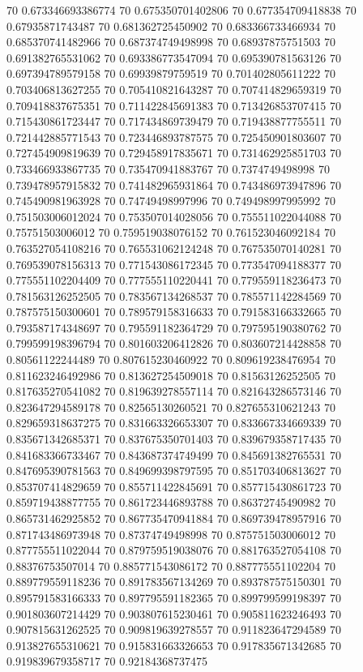{70 0.673346693386774
70 0.675350701402806
70 0.677354709418838
70 0.67935871743487
70 0.681362725450902
70 0.683366733466934
70 0.685370741482966
70 0.687374749498998
70 0.68937875751503
70 0.691382765531062
70 0.693386773547094
70 0.695390781563126
70 0.697394789579158
70 0.69939879759519
70 0.701402805611222
70 0.703406813627255
70 0.705410821643287
70 0.707414829659319
70 0.709418837675351
70 0.711422845691383
70 0.713426853707415
70 0.715430861723447
70 0.717434869739479
70 0.719438877755511
70 0.721442885771543
70 0.723446893787575
70 0.725450901803607
70 0.727454909819639
70 0.729458917835671
70 0.731462925851703
70 0.733466933867735
70 0.735470941883767
70 0.7374749498998
70 0.739478957915832
70 0.741482965931864
70 0.743486973947896
70 0.745490981963928
70 0.74749498997996
70 0.749498997995992
70 0.751503006012024
70 0.753507014028056
70 0.755511022044088
70 0.75751503006012
70 0.759519038076152
70 0.761523046092184
70 0.763527054108216
70 0.765531062124248
70 0.767535070140281
70 0.769539078156313
70 0.771543086172345
70 0.773547094188377
70 0.775551102204409
70 0.777555110220441
70 0.779559118236473
70 0.781563126252505
70 0.783567134268537
70 0.785571142284569
70 0.787575150300601
70 0.789579158316633
70 0.791583166332665
70 0.793587174348697
70 0.795591182364729
70 0.797595190380762
70 0.799599198396794
70 0.801603206412826
70 0.803607214428858
70 0.80561122244489
70 0.807615230460922
70 0.809619238476954
70 0.811623246492986
70 0.813627254509018
70 0.81563126252505
70 0.817635270541082
70 0.819639278557114
70 0.821643286573146
70 0.823647294589178
70 0.82565130260521
70 0.827655310621243
70 0.829659318637275
70 0.831663326653307
70 0.833667334669339
70 0.835671342685371
70 0.837675350701403
70 0.839679358717435
70 0.841683366733467
70 0.843687374749499
70 0.845691382765531
70 0.847695390781563
70 0.849699398797595
70 0.851703406813627
70 0.853707414829659
70 0.855711422845691
70 0.857715430861723
70 0.859719438877755
70 0.861723446893788
70 0.86372745490982
70 0.865731462925852
70 0.867735470941884
70 0.869739478957916
70 0.871743486973948
70 0.87374749498998
70 0.875751503006012
70 0.877755511022044
70 0.879759519038076
70 0.881763527054108
70 0.88376753507014
70 0.885771543086172
70 0.887775551102204
70 0.889779559118236
70 0.891783567134269
70 0.893787575150301
70 0.895791583166333
70 0.897795591182365
70 0.899799599198397
70 0.901803607214429
70 0.903807615230461
70 0.905811623246493
70 0.907815631262525
70 0.909819639278557
70 0.911823647294589
70 0.913827655310621
70 0.915831663326653
70 0.917835671342685
70 0.919839679358717
70 0.92184368737475
}
